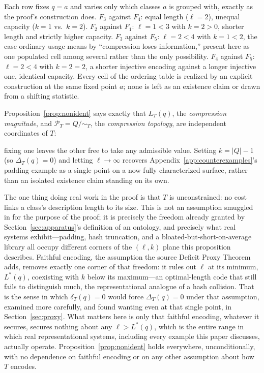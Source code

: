 \documentclass[11pt]{article}
\theoremstyle{plain}
\begin{document}
Each row fixes $q=a$ and varies only which classes $a$ is grouped with, exactly as the proof's construction does. $F_3$ against $F_4$: equal length ($\ell=2$), unequal capacity ($k=1$ vs.\ $k=2$). $F_2$ against $F_1$: $\ell=1<3$ with $k=2>0$, shorter length and strictly higher capacity. $F_3$ against $F_5$: $\ell=2<4$ with $k=1<2$, the case ordinary usage means by ``compression loses information,'' present here as one populated cell among several rather than the only possibility. $F_4$ against $F_5$: $\ell=2<4$ with $k=2=2$, a shorter injective encoding against a longer injective one, identical capacity. Every cell of the ordering table is realized by an explicit construction at the same fixed point $a$; none is left as an existence claim or drawn from a shifting statistic.

Proposition~\ref{prop:nonident} says exactly that $L_T(q)$, the \emph{compression magnitude}, and $\mathcal{P}_T = Q/\!\sim_T$, the \emph{compression topology}, are independent coordinates of $T$:

\begin{center}
\end{center}

fixing one leaves the other free to take any admissible value. Setting $k = |Q|-1$ (so $\Delta_T(q)=0$) and letting $\ell \to \infty$ recovers Appendix~\ref{app:counterexamples}'s padding example as a single point on a now fully characterized surface, rather than an isolated existence claim standing on its own.

The one thing doing real work in the proof is that $T$ is unconstrained: no cost links a class's description length to its size. This is not an assumption smuggled in for the purpose of the proof; it is precisely the freedom already granted by Section~\ref{sec:apparatus}'s definition of an ontology, and precisely what real systems exhibit---padding, hash truncation, and a bloated-but-short-on-average library all occupy different corners of the $(\ell,k)$ plane this proposition describes. Faithful encoding, the assumption the source Deficit Proxy Theorem adds, removes exactly one corner of that freedom: it rules out $\ell$ at its minimum, $L^*(q)$, coexisting with $k$ below its maximum---an optimal-length code that still fails to distinguish much, the representational analogue of a hash collision. That is the sense in which $\delta_T(q)=0$ would force $\Delta_T(q)=0$ under that assumption, examined more carefully, and found wanting even at that single point, in Section~\ref{sec:proxy}. What matters here is only that faithful encoding, whatever it secures, secures nothing about any $\ell > L^*(q)$, which is the entire range in which real representational systems, including every example this paper discusses, actually operate. Proposition~\ref{prop:nonident} holds everywhere, unconditionally, with no dependence on faithful encoding or on any other assumption about how $T$ encodes.
\end{document}
